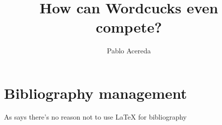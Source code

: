 \documentclass{article}
\author{Pablo Acereda}
\title{How can Wordcucks even compete?}
\begin{document}
\maketitle

\section{Bibliography management}

As \textcite{test} says there's no reason not to use \LaTeX{} for bibliography

\printbibliography
 
\end{document}
